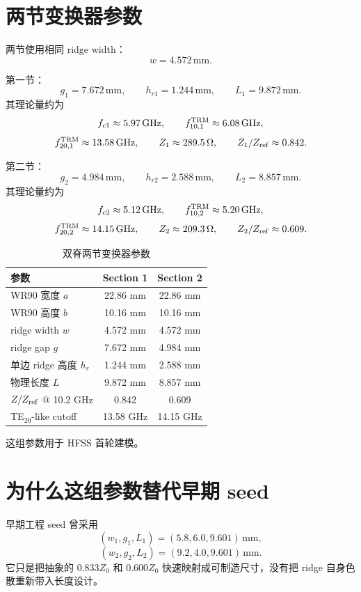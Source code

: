 \documentclass[11pt,a4paper]{ctexart}
\begin{document}
\section{两节变换器参数}

两节使用相同 ridge width：
\[
\boxed{w=4.572\,\mathrm{mm}}.
\]

第一节：
\[
\boxed{g_1=7.672\,\mathrm{mm}},
\qquad
\boxed{h_{r1}=1.244\,\mathrm{mm}},
\qquad
\boxed{L_1=9.872\,\mathrm{mm}}.
\]
其理论量约为
\[
f_{c1}\approx5.97\,\mathrm{GHz},
\qquad
f_{10,1}^{\rm TRM}\approx6.08\,\mathrm{GHz},
\]
\[
f_{20,1}^{\rm TRM}\approx13.58\,\mathrm{GHz},
\qquad
Z_1\approx289.5\,\Omega,
\qquad
Z_1/Z_{\rm ref}\approx0.842.
\]

第二节：
\[
\boxed{g_2=4.984\,\mathrm{mm}},
\qquad
\boxed{h_{r2}=2.588\,\mathrm{mm}},
\qquad
\boxed{L_2=8.857\,\mathrm{mm}}.
\]
其理论量约为
\[
f_{c2}\approx5.12\,\mathrm{GHz},
\qquad
f_{10,2}^{\rm TRM}\approx5.20\,\mathrm{GHz},
\]
\[
f_{20,2}^{\rm TRM}\approx14.15\,\mathrm{GHz},
\qquad
Z_2\approx209.3\,\Omega,
\qquad
Z_2/Z_{\rm ref}\approx0.609.
\]

\begin{table}[htbp]
\centering
\caption{双脊两节变换器参数}
\begin{tabular}{lcc}
\toprule
参数 & Section 1 & Section 2 \\ 
\midrule
WR90 宽度 \(a\) & 22.86 mm & 22.86 mm \\ 
WR90 高度 \(b\) & 10.16 mm & 10.16 mm \\ 
ridge width \(w\) & 4.572 mm & 4.572 mm \\ 
ridge gap \(g\) & 7.672 mm & 4.984 mm \\ 
单边 ridge 高度 \(h_r\) & 1.244 mm & 2.588 mm \\ 
物理长度 \(L\) & 9.872 mm & 8.857 mm \\ 
\(Z/Z_{\rm ref}\) @ 10.2 GHz & 0.842 & 0.609 \\ 
TE$_{20}$-like cutoff & 13.58 GHz & 14.15 GHz \\ 
\bottomrule
\end{tabular}
\end{table}

这组参数用于 HFSS 首轮建模。

\section{为什么这组参数替代早期 seed}

早期工程 seed 曾采用
\[
(w_1,g_1,L_1)=(5.8,6.0,9.601)\,\mathrm{mm},
\]
\[
(w_2,g_2,L_2)=(9.2,4.0,9.601)\,\mathrm{mm}.
\]
它只是把抽象的 \(0.833Z_0\) 和 \(0.600Z_0\) 快速映射成可制造尺寸，没有把 ridge 自身色散重新带入长度设计。
\end{document}

